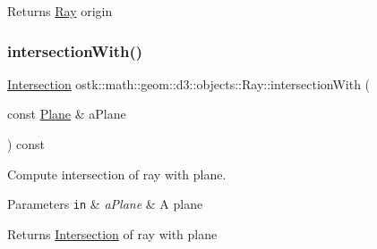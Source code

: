 \begin{DoxyReturn}{Returns}
\hyperlink{classostk_1_1math_1_1geom_1_1d3_1_1objects_1_1_ray}{Ray} origin 
\end{DoxyReturn}
\mbox{\label{classostk_1_1math_1_1geom_1_1d3_1_1objects_1_1_ray_aa4625c2dfe200ab9df245d2a4dc92f64}} 
\subsubsection{\texorpdfstring{intersection\+With()}{intersectionWith()}\hspace{0.1cm}{\footnotesize\ttfamily [1/3]}}
{\footnotesize\ttfamily \hyperlink{classostk_1_1math_1_1geom_1_1d3_1_1_intersection}{Intersection} ostk\+::math\+::geom\+::d3\+::objects\+::\+Ray\+::intersection\+With (\begin{DoxyParamCaption}\item[{const \hyperlink{classostk_1_1math_1_1geom_1_1d3_1_1objects_1_1_plane}{Plane} \&}]{a\+Plane }\end{DoxyParamCaption}) const}



Compute intersection of ray with plane. 


\begin{DoxyParams}[1]{Parameters}
\mbox{\tt in}  & {\em a\+Plane} & A plane \\
\hline
\end{DoxyParams}
\begin{DoxyReturn}{Returns}
\hyperlink{classostk_1_1math_1_1geom_1_1d3_1_1_intersection}{Intersection} of ray with plane 
\end{DoxyReturn}
\mbox{\label{classostk_1_1math_1_1geom_1_1d3_1_1objects_1_1_ray_ad51ec740a903fc78304898a08d28103b}} 
